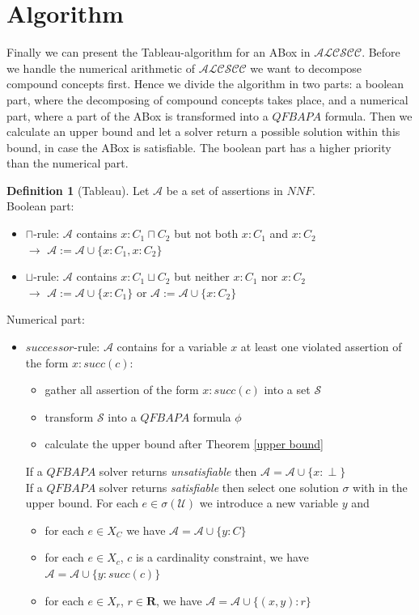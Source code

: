 \documentclass{book}
\theoremstyle{break}
\theoremstyle{definition}
\newtheorem{mydef}{Definition}
\begin{document}
\section{Algorithm}\label{Tableau}
Finally we can present the Tableau-algorithm for an ABox in $\mathcal{ALCSCC}$. Before we handle the numerical arithmetic of $\mathcal{ALCSCC}$ we want to decompose compound concepts first. Hence we divide the algorithm in two parts: a boolean part, where the decomposing of compound concepts takes place, and a numerical part, where a part of the ABox is transformed into a $QFBAPA$ formula. Then we calculate an upper bound and let a solver return a possible solution within this bound, in case the ABox is satisfiable. The boolean part has a higher priority than the numerical part. 
\begin{mydef}[Tableau]
Let $\mathcal{A}$ be a set of assertions in $NNF$.\\
Boolean part:
\begin{itemize}
\item\label{cap} $\sqcap$-rule: $\mathcal{A}$ contains $x:C_1\sqcap C_2$ but not both $x:C_1$ and $x:C_2$\\
$\rightarrow$ $\mathcal{A}:=\mathcal{A}\cup\{x:C_1, x:C_2\}$
\item\label{cup} $\sqcup$-rule: $\mathcal{A}$ contains $x:C_1\sqcup C_2$ but neither $x:C_1$ nor $x:C_2$\\
$\rightarrow$ $\mathcal{A}:=\mathcal{A}\cup\{x:C_1\}$ or $\mathcal{A}:=\mathcal{A}\cup\{x:C_2\}$
\end{itemize}
Numerical part:
\begin{itemize}
\item\label{succ} $successor$-rule: $\mathcal{A}$ contains for a variable $x$ at least one violated assertion of the form $x:succ(c)$:
\begin{itemize}
\item gather all assertion of the form $x:succ(c)$ into a set $\mathcal{S}$
\item transform $\mathcal{S}$ into a $QFBAPA$ formula $\phi$
\item calculate the upper bound after Theorem \ref{upper bound}
\end{itemize}
If a $QFBAPA$ solver returns \textit{unsatisfiable} then $\mathcal{A}=\mathcal{A}\cup\{x:\perp\}$\\
If a $QFBAPA$ solver returns \textit{satisfiable} then select one solution $\sigma$ with in the upper bound. For each $e\in\sigma(\mathcal{U})$ we introduce a new variable $y$ and
\begin{itemize}
\item for each $e\in X_C$ we have $\mathcal{A}=\mathcal{A}\cup\{y:C\}$
\item for each $e\in X_{c}$, $c$ is a cardinality constraint, we have $\mathcal{A}=\mathcal{A}\cup\{y:succ(c)\}$
\item for each $e\in X_r$, $r\in\mathbf{R}$, we have $\mathcal{A}=\mathcal{A}\cup\{(x,y):r\}$
\end{itemize}
\end{itemize}
\end{mydef}
\end{document}
